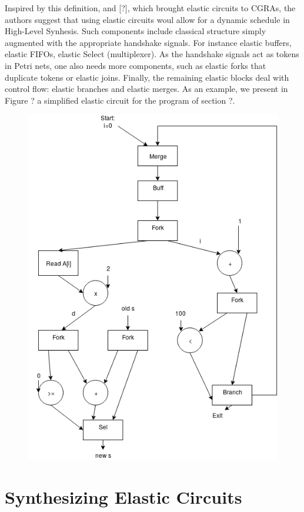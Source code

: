 \documentclass{article}
\begin{document}
Inspired by this definition, and [?], which brought elastic circuits to CGRAs, the authors suggest that using elastic circuits woul allow for a dynamic schedule in High-Level Synhesis.
Such components include classical structure simply augmented with the appropriate handshake signals. For instance elastic buffers, elastic FIFOs, elastic Select (multiplexer). As the handshake signals act as tokens in Petri nets, one also needs more components, such as elastic forks that duplicate tokens or elastic joins. Finally, the remaining elastic blocks deal with control flow: elastic branches and elastic merges.
As an example, we present in Figure ? a simplified elastic circuit for the program of section ?.
\begin{figure}
  \center
  \includegraphics[scale=0.3]{circuit.png}
\end{figure}


\section{Synthesizing Elastic Circuits}
\end{document}
